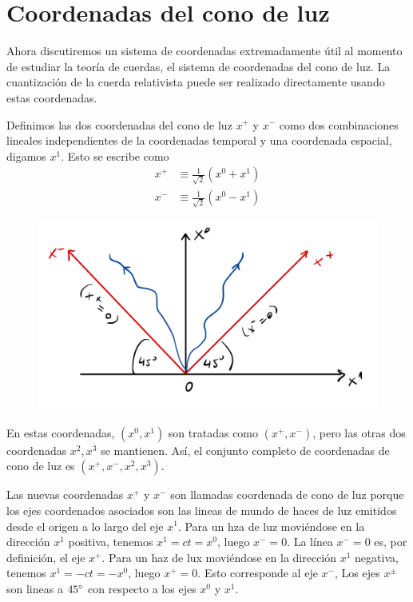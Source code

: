 \section{Coordenadas del cono de luz}
Ahora discutiremos un sistema de coordenadas extremadamente útil al momento de estudiar la teoría de cuerdas, el sistema de coordenadas del cono de luz. La cuantización de la cuerda relativista puede ser realizado directamente usando estas coordenadas.

Definimos las dos coordenadas del cono de luz $x^+$ y $x^-$ como dos combinaciones lineales independientes de la coordenadas temporal y una coordenada espacial, digamos $x^1$. Esto se escribe como
\begin{equation}\label{2.48}
\boxed{\begin{split}
    x^+&\equiv\frac{1}{\sqrt{2}}(x^0+x^1)\\
    x^-&\equiv\frac{1}{\sqrt{2}}(x^0-x^1)
\end{split}}
\end{equation}

\begin{figure}[h!]
    \centering
    \includegraphics[scale=0.15]{img/light-cone coord.jpg}
\end{figure}
En estas coordenadas, $(x^0,x^1)$ son tratadas como $(x^+,x^-)$, pero las otras dos coordenadas $x^2,x^3$ se mantienen. Así, el conjunto completo de coordenadas de cono de luz es $(x^+,x^-,x^2,x^3)$.

Las nuevas coordenadas $x^+$ y $x^-$ son llamadas coordenada de cono de luz porque los ejes coordenados asociados son las lineas de mundo de haces de luz emitidos desde el origen a lo largo del eje $x^1$. Para un hza de luz moviéndose en la dirección $x^1$ positiva, tenemos $x^1=ct=x^0$, luego $x^-=0$. La línea $x^-=0$ es, por definición, el eje $x^+$. Para un haz de lux moviéndose en la dirección $x^1$ negativa, tenemos $x^1=-ct=-x^0$, luego $x^+=0$. Esto corresponde al eje $x^-$, Los ejes $x^{\pm}$ son lineas a $45\degree$ con respecto a los ejes $x^0$ y $x^1$.

